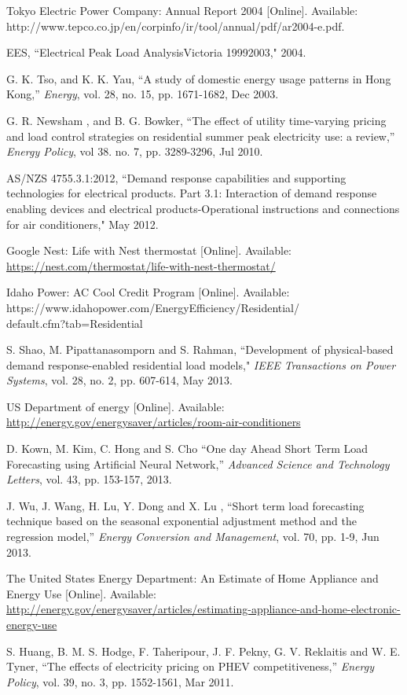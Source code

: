 \documentclass[10pt,twocolumn,twoside]{IEEEtran}
\begin{document}
\begin{thebibliography}{99}
 Tokyo Electric Power Company: Annual Report 2004 [Online]. Available: 
http://www.tepco.co.jp/en/corpinfo/ir/tool/annual/pdf/ar2004-e.pdf. 

 EES, ``Electrical Peak Load AnalysisVictoria 19992003," 2004. 


 G. K. Tso, and K. K. Yau, ``A study of domestic energy usage patterns in Hong Kong,'' \textit{Energy}, vol. 28, no. 15, pp. 1671-1682, Dec 2003.

 G. R. Newsham , and B. G. Bowker, ``The effect of utility time-varying pricing and load control strategies on residential summer peak electricity use: a review,'' \textit{Energy Policy}, vol 38. no. 7, pp. 3289-3296, Jul 2010.


 AS/NZS 4755.3.1:2012, ``Demand response capabilities and supporting technologies for electrical products. Part 3.1: Interaction of demand response enabling devices and electrical products-Operational instructions and connections for air conditioners," May 2012.




 Google Nest: Life with Nest thermostat [Online]. Available: \url{https://nest.com/thermostat/life-with-nest-thermostat/}

 Idaho Power: AC Cool Credit Program [Online]. 
Available:
https://www.idahopower.com/EnergyEfficiency/Residential/\\default.cfm?tab=Residential

 S. Shao, M. Pipattanasomporn and S. Rahman, ``Development of physical-based demand response-enabled residential load models," \textit{IEEE Transactions on Power Systems}, vol. 28, no. 2, pp. 607-614, May 2013.



 US Department of energy [Online]. Available: \url{http://energy.gov/energysaver/articles/room-air-conditioners}

 D. Kown, M. Kim, C. Hong and S. Cho ``One day Ahead Short Term Load Forecasting using Artificial Neural Network,'' \textit{Advanced Science and Technology Letters}, vol. 43, pp. 153-157, 2013.



 J. Wu, J. Wang, H. Lu, Y. Dong and X. Lu , ``Short term load forecasting technique based on the seasonal exponential adjustment method and the regression model,'' \textit{Energy Conversion and Management}, vol. 70, pp. 1-9, Jun 2013.


 The United States Energy Department: An Estimate of Home Appliance and Energy Use [Online]. Available: \url{http://energy.gov/energysaver/articles/estimating-appliance-and-home-electronic-energy-use}



 S. Huang, B. M. S. Hodge, F. Taheripour, J. F. Pekny, G. V. Reklaitis and W. E. Tyner, ``The effects of electricity pricing on PHEV competitiveness,''  \textit{Energy Policy}, vol. 39, no. 3, pp. 1552-1561, Mar 2011.



\end{thebibliography}
\end{document}

